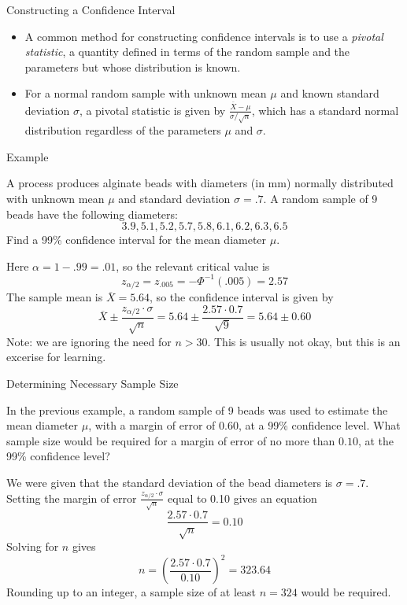 \documentclass[t,handout]{beamer}
\begin{document}
        \begin{frame}{Constructing a Confidence Interval}
        \begin{itemize}
        \item A common method for constructing confidence intervals is to use a \emph{pivotal statistic}, a quantity defined in terms of the random sample and the parameters but whose distribution is known.
        
        \pause \item For a normal random sample with unknown mean $\mu$ and known standard deviation $\sigma$, a pivotal statistic is given by $\frac{\overline{X}-\mu}{\sigma/\sqrt{n}}$, which has a standard normal distribution regardless of the parameters $\mu$ and $\sigma$.
        \end{itemize}
        \end{frame}

    \begin{frame}{Example}
    \begin{block}{}
    A process produces alginate beads
    with diameters (in mm) normally distributed with unknown mean $\mu$ and standard deviation
    $\sigma=.7$. A random sample of 9 beads have the following diameters:
    $$3.9, 5.1, 5.2, 5.7, 5.8, 6.1, 6.2, 6.3, 6.5$$
    Find a 99\% confidence interval for the mean diameter $\mu$.
    \end{block}
    \pause Here $\alpha=1-.99=.01$, so the relevant critical value is 
    $$z_{\alpha/2}=z_{.005} = -\Phi^{-1}(.005) = 2.57$$
    \pause The sample mean is $\overline X=5.64$, so the confidence interval is given by
    $$\overline X \pm \frac{z_{\alpha/2} \cdot \sigma}{\sqrt n} = 5.64 \pm \frac{2.57 \cdot 0.7}{\sqrt{9}} = 5.64 \pm  0.60$$
    Note: we are ignoring the need for $n>30$. This is usually not okay, but this is an excerise for learning.
    \end{frame}
    
    \begin{frame}{Determining Necessary Sample Size}
    \begin{block}{}
    In the previous example, a random sample of 9 beads was used to estimate the mean diameter $\mu$, with a margin of error of $0.60$, at a 99\% confidence level. What sample size would be required for a margin of error of no more than $0.10$, at the 99\% confidence level?
    \end{block}
    \pause
    We were given that the standard deviation of the bead diameters is $\sigma=.7$. 
     Setting the margin of error $\frac{z_{\alpha/2} \cdot \sigma}{\sqrt n}$ equal to 0.10 gives an equation
    $$ \frac{2.57 \cdot 0.7}{\sqrt n} = 0.10$$
    \pause Solving for $n$ gives $$n=\left(\frac{2.57\cdot0.7}{0.10}\right)^2=323.64$$
    \pause Rounding up to an integer, a sample size of at least $n=324$ would be required.
    \end{frame}
    
\end{document}
